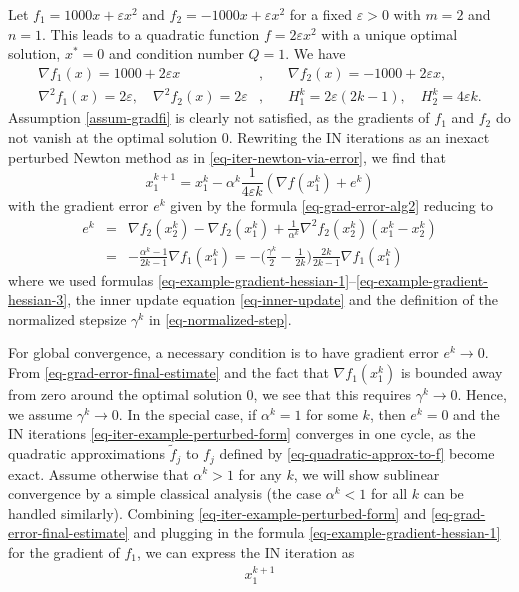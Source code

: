 \documentclass[final,numbook]{svjour3}
\begin{document}
\begin{example}\label{example-sublinear-conv} Let $f_1 = 1000 x + \varepsilon x^2$ and $f_2 = -1000x + \varepsilon x^2$ for a fixed $\varepsilon>0$ with $m=2$ and $n=1$. This leads to a quadratic function $f=2\varepsilon x^2$ with a unique optimal solution, $x^* = 0$ and condition number $Q=1$. We have
\begin{eqnarray}\label{eq-example-gradient-hessian-1} \nabla f_1(x) = 1000 + 2\varepsilon x &,& \quad \nabla f_2(x) = -1000 + 2\varepsilon x, \\ 
  \nabla^2 f_1(x)=2\varepsilon , \quad \nabla^2 
   f_2(x)=2\varepsilon&,& \quad 
   H_1^k = 2\varepsilon (2k-1) , \quad H_2^k = 4\varepsilon k \label{eq-example-gradient-hessian-3}.
\end{eqnarray}  
Assumption \ref{assum-gradfi} is clearly not satisfied, as the gradients of $f_1$ and $f_2$ do not vanish at the optimal solution 0. Rewriting the IN iterations as an inexact perturbed Newton method as in \eqref{eq-iter-newton-via-error}, we find that
  \begin{equation}\label{eq-iter-example-perturbed-form} x_1^{k+1} = x_1^k - \alpha^k \frac{1}{4\varepsilon k}(\nabla f(x_1^k) + e^k ) \end{equation}
with the gradient error $e^k$ given by the formula \eqref{eq-grad-error-alg2} reducing to 
 \begin{eqnarray} e^k &=&  \nabla f_2 (x_2^k)-\nabla f_2 (x_1^k) + \frac{1}{\alpha^k} \nabla^2 f_2(x_2^k)(x_1^k - x_2^k) \nonumber \\
       
       
        
        &=& -\frac{\alpha^k - 1}{2k - 1} \nabla f_1(x_1^k) 
        = -\bigg(  \frac{\gamma^k }{2} - \frac{1}{2k}\bigg)\frac{2k}{2k-1}  \nabla f_1(x_1^k) \label{eq-grad-error-final-estimate}
        
 \end{eqnarray}
where we used formulas \eqref{eq-example-gradient-hessian-1}--\eqref{eq-example-gradient-hessian-3}, the inner update equation \eqref{eq-inner-update} and the definition of the normalized stepsize $\gamma^k$ in \eqref{eq-normalized-step}.
  

For global convergence, a necessary condition is to have gradient error $e^k \to 0$. From \eqref{eq-grad-error-final-estimate} and the fact that $\nabla f_1(x_1^k)$ is bounded away from zero around the optimal solution 0, we see that this requires $\gamma^k \to 0$. Hence, we assume $\gamma^k \to 0$. In the special case, if $\alpha^k = 1$ for some $k$, then $e^k = 0$ and the IN iterations \eqref{eq-iter-example-perturbed-form} converges in one cycle, as the quadratic approximations $\tilde{f}_j$ to $f_j$ defined by \eqref{eq-quadratic-approx-to-f} become exact. Assume otherwise that $\alpha^k > 1$ for any $k$, we will show sublinear convergence by a simple classical analysis (the case $\alpha^k < 1$ for all $k$ can be handled similarly).  
Combining \eqref{eq-iter-example-perturbed-form} and \eqref{eq-grad-error-final-estimate} and plugging in the formula \eqref{eq-example-gradient-hessian-1} for the gradient of $f_1$, we can express the IN iteration as
  \begin{eqnarray} x_1^{k+1} 
  

\end{eqnarray}
\end{example}
\end{document}
